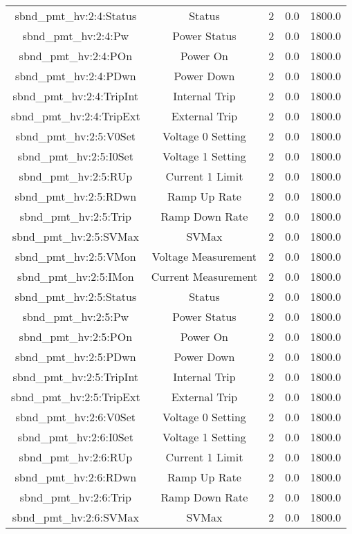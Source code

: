 \begin{center}
\begin{longtable}{c | c c c c }
sbnd\_pmt\_hv:2:4:Status & Status & 2 & 0.0 & 1800.0\\ 
sbnd\_pmt\_hv:2:4:Pw & Power Status & 2 & 0.0 & 1800.0\\ 
sbnd\_pmt\_hv:2:4:POn & Power On & 2 & 0.0 & 1800.0\\ 
sbnd\_pmt\_hv:2:4:PDwn & Power Down & 2 & 0.0 & 1800.0\\ 
sbnd\_pmt\_hv:2:4:TripInt & Internal Trip & 2 & 0.0 & 1800.0\\ 
sbnd\_pmt\_hv:2:4:TripExt & External Trip & 2 & 0.0 & 1800.0\\ 
sbnd\_pmt\_hv:2:5:V0Set & Voltage 0 Setting & 2 & 0.0 & 1800.0\\ 
sbnd\_pmt\_hv:2:5:I0Set & Voltage 1 Setting & 2 & 0.0 & 1800.0\\ 
sbnd\_pmt\_hv:2:5:RUp & Current 1 Limit & 2 & 0.0 & 1800.0\\ 
sbnd\_pmt\_hv:2:5:RDwn & Ramp Up Rate & 2 & 0.0 & 1800.0\\ 
sbnd\_pmt\_hv:2:5:Trip & Ramp Down Rate & 2 & 0.0 & 1800.0\\ 
sbnd\_pmt\_hv:2:5:SVMax & SVMax & 2 & 0.0 & 1800.0\\ 
sbnd\_pmt\_hv:2:5:VMon & Voltage Measurement & 2 & 0.0 & 1800.0\\ 
sbnd\_pmt\_hv:2:5:IMon & Current Measurement & 2 & 0.0 & 1800.0\\ 
sbnd\_pmt\_hv:2:5:Status & Status & 2 & 0.0 & 1800.0\\ 
sbnd\_pmt\_hv:2:5:Pw & Power Status & 2 & 0.0 & 1800.0\\ 
sbnd\_pmt\_hv:2:5:POn & Power On & 2 & 0.0 & 1800.0\\ 
sbnd\_pmt\_hv:2:5:PDwn & Power Down & 2 & 0.0 & 1800.0\\ 
sbnd\_pmt\_hv:2:5:TripInt & Internal Trip & 2 & 0.0 & 1800.0\\ 
sbnd\_pmt\_hv:2:5:TripExt & External Trip & 2 & 0.0 & 1800.0\\ 
sbnd\_pmt\_hv:2:6:V0Set & Voltage 0 Setting & 2 & 0.0 & 1800.0\\ 
sbnd\_pmt\_hv:2:6:I0Set & Voltage 1 Setting & 2 & 0.0 & 1800.0\\ 
sbnd\_pmt\_hv:2:6:RUp & Current 1 Limit & 2 & 0.0 & 1800.0\\ 
sbnd\_pmt\_hv:2:6:RDwn & Ramp Up Rate & 2 & 0.0 & 1800.0\\ 
sbnd\_pmt\_hv:2:6:Trip & Ramp Down Rate & 2 & 0.0 & 1800.0\\ 
sbnd\_pmt\_hv:2:6:SVMax & SVMax & 2 & 0.0 & 1800.0\\ 

\end{longtable}
\end{center}
